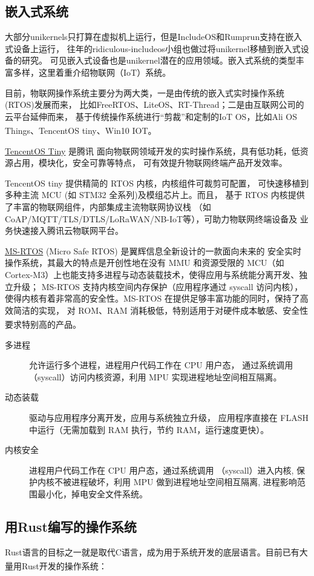 \documentclass[UTF8,fontset=none,linespread=1.15]{ctexart}
\let\nosupcite\cite
\renewcommand*{\cite}[1]{\textsuperscript{\nosupcite{#1}}}
\begin{document}
\subsection{嵌入式系统}
大部分unikernels只打算在虚拟机上运行，但是IncludeOS和Rumprun支持在嵌入式设备上运行，
往年的ridiculous-includeos小组也做过将unikernel移植到嵌入式设备的研究。
可见嵌入式设备也是unikernel潜在的应用领域。嵌入式系统的类型丰富多样，这里着重介绍物联网（IoT）系统。

目前，物联网操作系统主要分为两大类，一是由传统的嵌入式实时操作系统(RTOS)发展而来，
比如FreeRTOS、LiteOS、RT-Thread；二是由互联网公司的云平台延伸而来，
基于传统操作系统进行“剪裁”和定制的IoT OS，比如Ali OS Things、TencentOS tiny、Win10 IOT。\cite{bib:iot-sys}

\href{https://github.com/OpenAtomFoundation/TencentOS-tiny}{TencentOS Tiny} 是腾讯
面向物联网领域开发的实时操作系统，具有低功耗，低资源占用，模块化，安全可靠等特点，
可有效提升物联网终端产品开发效率。

TencentOS tiny 提供精简的 RTOS 内核，内核组件可裁剪可配置，
可快速移植到多种主流 MCU (如 STM32 全系列)及模组芯片上。而且，
基于 RTOS 内核提供了丰富的物联网组件，内部集成主流物联网协议栈
（如CoAP/MQTT/TLS/DTLS/LoRaWAN/NB-IoT等），可助力物联网终端设备及
业务快速接入腾讯云物联网平台。

\href{https://github.com/ms-rtos}{MS-RTOS} (Micro Safe RTOS) 是翼辉信息全新设计的一款面向未来的
安全实时操作系统，其最大的特点是开创性地在没有 MMU 和资源受限的 MCU（如Cortex-M3）上也能支持多进程与动态装载技术，使得应用与系统能分离开发、独立升级；
MS-RTOS 支持内核空间内存保护（应用程序通过 syscall 访问内核），
使得内核有着非常高的安全性。MS-RTOS 在提供足够丰富功能的同时，保持了高效简洁的实现，
对 ROM、RAM 消耗极低，特别适用于对硬件成本敏感、安全性要求特别高的产品。\cite{bib:ms-rtos}

\begin{description}
\item[多进程] 允许运行多个进程，进程用户代码工作在 CPU 用户态，
通过系统调用（syscall）访问内核资源，利用 MPU 实现进程地址空间相互隔离。
\item[动态装载] 驱动与应用程序分离开发，应用与系统独立升级，
应用程序直接在 FLASH 中运行（无需加载到 RAM 执行，节约 RAM，运行速度更快）。
\item[内核安全] 进程用户代码工作在 CPU 用户态，通过系统调用
（syscall）进入内核, 保护内核不被进程破坏，利用 MPU 做到进程地址空间相互隔离,
进程影响范围最小化，掉电安全文件系统。
\end{description}
\subsection{用Rust编写的操作系统}
Rust语言的目标之一就是取代C语言，成为用于系统开发的底层语言。目前已有大量用Rust开发的操作系统：\cite{bib:rust-os-comparison}
\end{document}
